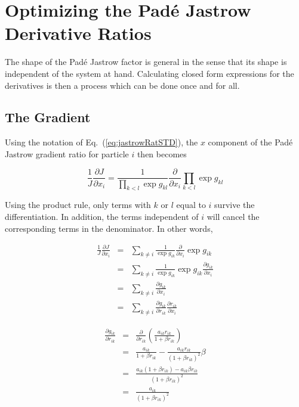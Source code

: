 \section{Optimizing the Padé Jastrow Derivative Ratios}

The shape of the Padé Jastrow factor is general in the sense that its shape is independent of the system at hand. Calculating closed form expressions for the derivatives is then a process which can be done once and for all. 

\subsection{The Gradient}

Using the notation of Eq.~(\ref{eq:jastrowRatSTD}), the $x$ component of the Padé Jastrow gradient ratio for particle $i$ then becomes

\begin{equation}
 \frac{1}{J}\frac{\partial J}{\partial x_i} = \frac{1}{\prod_{k < l}\exp g_{kl}}\frac{\partial }{\partial x_i}\prod_{k < l}\exp g_{kl} 
\end{equation}

Using the product rule, only terms with $k$ or $l$ equal to $i$ survive the differentiation. In addition, the terms independent of $i$ will cancel the corresponding terms in the denominator. In other words, 

\begin{eqnarray}
  \frac{1}{J}\frac{\partial J}{\partial x_i} &=& \sum_{k \ne i} \frac{1}{\exp g_{ik}}\frac{\partial}{\partial x_i} \exp g_{ik} \nonumber\\
  &=& \sum_{k \ne i} \frac{1}{\exp g_{ik}}\exp g_{ik}\frac{\partial g_{ik}}{\partial x_i} \nonumber \\
  &=& \sum_{k \ne i} \frac{\partial g_{ik}}{\partial x_i} \nonumber \\
  &=& \sum_{k \ne i} \frac{\partial g_{ik}}{\partial r_{ik}}\frac{\partial r_{ik}}{\partial x_i}
\end{eqnarray}

\begin{eqnarray}
 \frac{\partial g_{ik}}{\partial r_{ik}} &=& \frac{\partial }{\partial r_{ik}} \left(\frac{a_{ik}r_{ik}}{1 + \beta r_{ik}}\right) \nonumber\\
  &=& \frac{a_{ik}}{1 + \beta r_{ik}} - \frac{a_{ik}r_{ik}}{(1 + \beta r_{ik})^2}\beta \nonumber \\
  &=& \frac{a_{ik}(1 + \beta r_{ik}) - a_{ik}\beta r_{ik}}{(1 + \beta r_{ik})^2}  \nonumber \\
  &=& \frac{a_{ik}}{(1 + \beta r_{ik})^2} \label{eq:jastrowDgikDrik}
\end{eqnarray}

